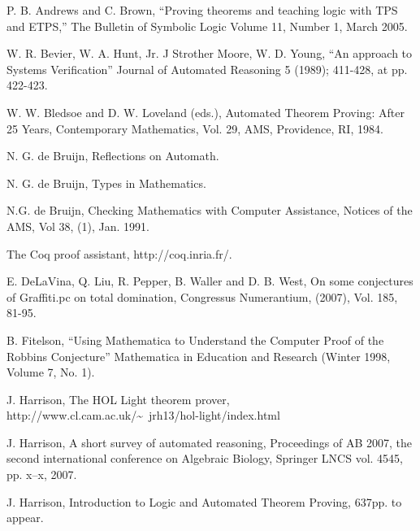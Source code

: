 \documentclass{llncs}
\begin{document}
\begin{thebibliography}{A}

 P. B. Andrews and C. Brown, ``Proving theorems and teaching logic with 
TPS and ETPS,'' The Bulletin of Symbolic Logic 
Volume 11, Number 1, March 2005.

 W. R. Bevier, W. A. Hunt, Jr. J Strother Moore, W. D. Young, ``An approach to Systems Verification''  Journal of Automated Reasoning 5 (1989); 411-428, at pp. 422-423.

 W. W. Bledsoe and D. W. Loveland (eds.), Automated
Theorem Proving: After 25 Years, Contemporary Mathematics, Vol. 29,
AMS, Providence, RI, 1984.

 N. G. de Bruijn, Reflections on Automath.

 N. G. de Bruijn, Types in Mathematics.

  N.G. de Bruijn, Checking Mathematics with Computer Assistance, Notices of the AMS,
Vol 38, (1), Jan. 1991.

 The Coq proof assistant, http://coq.inria.fr/.



 E. DeLaVina, Q. Liu, R. Pepper, B. Waller and D. B. West, On some conjectures of
Graffiti.pc on total domination, Congressus Numerantium, (2007), Vol. 185, 81-95.

  B. Fitelson, ``Using Mathematica to Understand the Computer Proof of the Robbins Conjecture''
Mathematica in Education and Research (Winter 1998, Volume 7, No. 1).



 J. Harrison, The HOL Light theorem prover,
http://www.cl.cam.ac.uk/\~~jrh13/hol-light/index.html

 J. Harrison, A short survey of automated reasoning,
Proceedings of AB 2007, the second international conference on Algebraic Biology, Springer LNCS vol. 4545, pp. x--x, 2007.

 J. Harrison, Introduction to Logic and Automated
Theorem Proving, 637pp. to appear.


\end{thebibliography}
\end{document}
